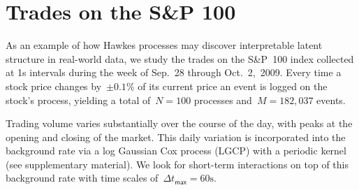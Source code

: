 \section{Trades on the S\&P 100}
\label{sec:financial}
As an example of how Hawkes processes may discover interpretable
latent structure in real-world data, we study the trades on the
S\&P~100 index collected at 1s intervals during the week of Sep.~28
through Oct.~2,~2009. Every time a stock price changes by~${\pm0.1\%}$
of its current price an event is logged on the stock's process,
yielding a total of~${N=100}$ processes and~${M=182,037}$ events.

Trading volume varies substantially over the course of the day, with
peaks at the opening and closing of the market. This daily variation
is incorporated into the background rate via a log Gaussian Cox
process (LGCP) with a periodic kernel (see supplementary material). We
look for short-term interactions on top of this background rate with
time scales of~${\Delta t_{\textsf{max}}=60\mathrm{s}}$.

